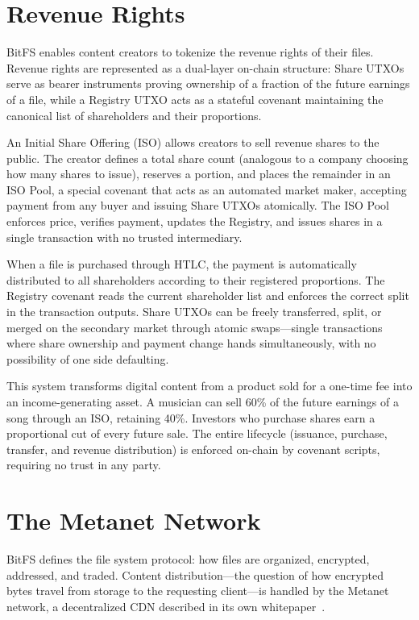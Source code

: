 \documentclass[11pt,a4paper]{article}
\begin{document}
\section{Revenue Rights}

BitFS enables content creators to tokenize the revenue rights of their files. Revenue rights are represented as a dual-layer on-chain structure: Share UTXOs serve as bearer instruments proving ownership of a fraction of the future earnings of a file, while a Registry UTXO acts as a stateful covenant maintaining the canonical list of shareholders and their proportions.

An Initial Share Offering (ISO) allows creators to sell revenue shares to the public. The creator defines a total share count (analogous to a company choosing how many shares to issue), reserves a portion, and places the remainder in an ISO Pool, a special covenant that acts as an automated market maker, accepting payment from any buyer and issuing Share UTXOs atomically. The ISO Pool enforces price, verifies payment, updates the Registry, and issues shares in a single transaction with no trusted intermediary.

When a file is purchased through HTLC, the payment is automatically distributed to all shareholders according to their registered proportions. The Registry covenant reads the current shareholder list and enforces the correct split in the transaction outputs. Share UTXOs can be freely transferred, split, or merged on the secondary market through atomic swaps---single transactions where share ownership and payment change hands simultaneously, with no possibility of one side defaulting.

This system transforms digital content from a product sold for a one-time fee into an income-generating asset. A musician can sell 60\% of the future earnings of a song through an ISO, retaining 40\%. Investors who purchase shares earn a proportional cut of every future sale. The entire lifecycle (issuance, purchase, transfer, and revenue distribution) is enforced on-chain by covenant scripts, requiring no trust in any party.

\section{The Metanet Network}

BitFS defines the file system protocol: how files are organized, encrypted, addressed, and traded. Content distribution---the question of how encrypted bytes travel from storage to the requesting client---is handled by the Metanet network, a decentralized CDN described in its own whitepaper~\cite{metanet_multi}.
\end{document}
